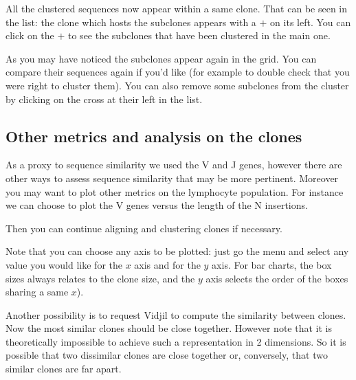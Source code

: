 \documentclass[11pt]{article}
\begin{document}
All the clustered sequences now appear within a same clone. That can be seen
in the list: the clone which hosts the subclones appears with a $+$ on its
left. You can click on the $+$ to see the subclones that have been clustered in
the main one.

As you may have noticed the subclones appear again in the grid. You can
compare their sequences again if you'd like (for example to double check that
you were right to cluster them). You can also remove some subclones from the
cluster by clicking on the cross at their left in the list.


\subsection{Other metrics and analysis on the clones}

As a proxy to sequence similarity we used the V and J genes, however there are
other ways to assess sequence similarity that may be more pertinent.
Moreover you may want to plot other metrics on the lymphocyte population.
%
For instance we can choose to plot the V genes versus the length of the N
insertions.

Then you can continue aligning and clustering clones if necessary.


Note that you can choose any axis to be plotted: just go the  menu and
select any value you would like for the $x$ axis and for the $y$ axis.
For bar charts, the box sizes always relates to the clone size,
and the $y$ axis selects the order of the boxes sharing a same $x$).



Another possibility is to request Vidjil to compute the similarity between
clones.
Now the most similar clones should be close together. However note that it is
theoretically impossible to achieve such a representation in 2 dimensions. So
it is possible that two dissimilar clones are close together or, conversely,
that two similar clones are far apart.
\end{document}
